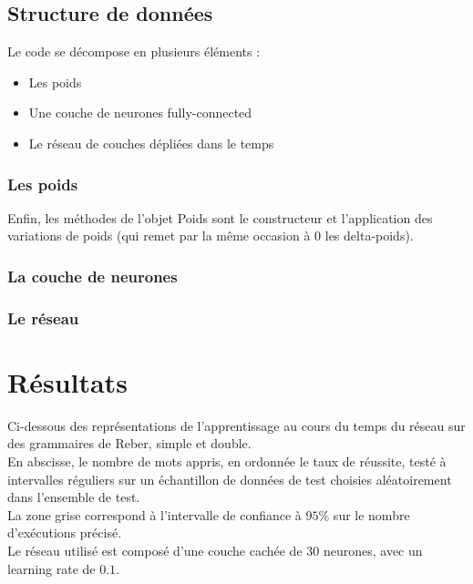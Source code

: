 \bigskip

\subsection{Structure de données}

Le code se décompose en plusieurs éléments :
\begin{itemize}
  \item Les poids
  \item Une couche de neurones fully-connected
  \item Le réseau de couches dépliées dans le temps
\end{itemize}

\subsubsection{Les poids}


Enfin, les méthodes de l'objet Poids sont le constructeur et
l'application des variations de poids (qui remet par la même occasion à 0
les delta-poids).

\subsubsection{La couche de neurones}


\subsubsection{Le réseau}


\section{Résultats}
Ci-dessous des représentations de l'apprentissage au cours du temps du réseau sur des
grammaires de Reber, simple et double. \\
En abscisse, le nombre de mots appris, en ordonnée le taux de réussite, testé à
intervalles réguliers sur un échantillon de données de test choisies aléatoirement
dans l'ensemble de test. \\
La zone grise correspond à l'intervalle de confiance à $95\%$ sur le nombre d'exécutions
précisé.\\
Le réseau utilisé est composé d'une couche cachée de 30 neurones, avec un learning
rate de $0.1$.

